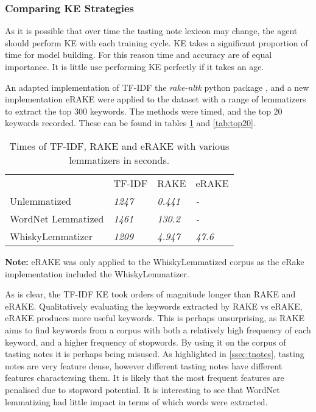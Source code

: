 \subsubsection{Comparing KE Strategies}\label{sssec:kwecomp}
As it is possible that over time the tasting note lexicon may change, the agent should perform KE with each training 
cycle. KE takes a significant proportion of time for model building. For this reason time and accuracy are of equal
importance.  It is little use performing KE perfectly if it takes an age.

An adapted implementation of TF-IDF \cite{tf_idf_imp} the \emph{rake-nltk} python package \cite{sharmer_2018}, and a
new implementation eRAKE were applied to the dataset with a range of lemmatizers to extract the top 300 keywords.
The methods were timed, and the top 20 keywords recorded. 
These can be found in tables \ref{tab:times} and \ref{tab:top20}.

\begin{table}
    \centering
    \begin{threeparttable}

        \caption{Times of TF-IDF, RAKE and eRAKE with various lemmatizers in seconds.}\label{tab:times}
        \begin{tabular}{llll} 
        \toprule
                           & TF-IDF        & RAKE           & eRAKE           \\
        Unlemmatized       & \textit{1247} & \textit{0.441} & \textit{-}      \\
        WordNet Lemmatized & \textit{1461} & \textit{130.2} & \textit{-}      \\
        WhiskyLemmatizer   & \textit{1209} & \textit{4.947} & \textit{47.6}  \\
        \bottomrule
        \end{tabular}
        \begin{tablenotes}
            \small
            \item \textbf{Note:} eRAKE was only applied to the WhiskyLemmatized corpus
            as the eRake implementation included the WhiskyLemmatizer.
        \end{tablenotes}
    \end{threeparttable}
\end{table}

As is clear, the TF-IDF KE took orders of magnitude longer than RAKE and eRAKE.  
Qualitatively evaluating the keywords extracted by RAKE vs eRAKE, eRAKE produces more useful keywords.
This is perhaps unsurprising, as RAKE aims to find keywords from a corpus with both a relatively high frequency
of each keyword, and a higher frequency of stopwords.  By using it on the corpus of tasting notes it is perhaps 
being misused. As highlighted in \autoref{ssec:tnotes}, tasting notes are very feature dense, however different
tasting notes have different features charactersing them.  It is likely that the most frequent features are
penalised due to stopword potential. It is interesting to see that WordNet lemmatizing had little impact 
in terms of which words were extracted.

